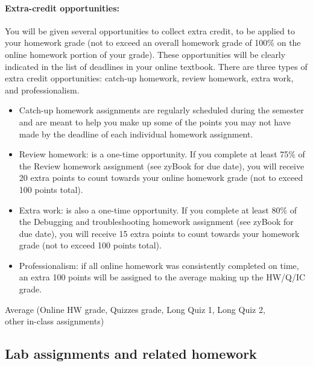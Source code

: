 \documentclass[12pt]{scrartcl}
\begin{document}
\paragraph{Extra-credit opportunities:} 
You will be given several opportunities to collect extra credit, to be applied to your homework grade (not to exceed an overall homework grade of 100\% on the online homework portion of your grade). 
These opportunities will be clearly indicated in the list of deadlines in your online textbook. 
There are three types of extra credit opportunities: catch-up homework, review homework, extra work, and professionalism.
\begin{itemize}
\item Catch-up homework assignments are regularly scheduled during the semester and are meant to help you make up some of the points you may not have made by the deadline of each individual homework assignment. 
\item Review homework: is a one-time opportunity. If you complete at least 75\% of the Review homework assignment (see zyBook for due date), you will receive 20 extra points to count towards your online homework grade (not to exceed 100 points total).
\item Extra work: is also a one-time opportunity. If you complete at least 80\% of the Debugging and troubleshooting homework assignment (see zyBook for due date), you will receive 15 extra points to count towards your homework grade (not to exceed 100 points total).
\item Professionalism: if all online homework was consistently completed on time, an extra 100 points will be assigned to the average making up the HW/Q/IC grade.
\end{itemize}

\begin{tcolorbox}[colback=blue!5,colframe=blue!75!black,title=HW / Quizzes / In-Class Assignments Grade (HW/Q/IC)]
\begin{center}
Average (Online HW grade, Quizzes grade, Long Quiz 1, Long Quiz 2, \\ other in-class assignments)\\
\end{center}
\end{tcolorbox}

\subsection{Lab assignments and related homework}
\end{document}
